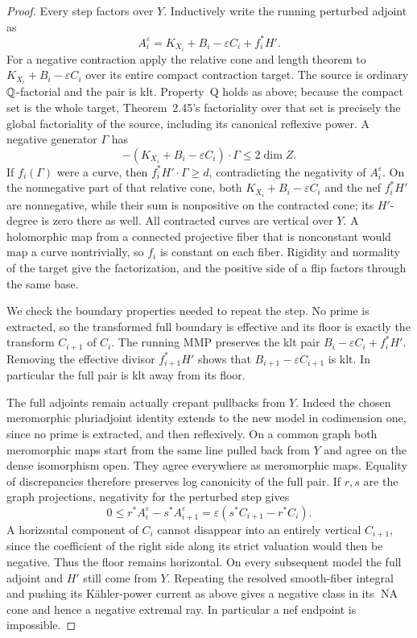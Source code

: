 \begin{proof}
Every step factors over \(Y\).  Inductively write the running perturbed
adjoint as
\[
 A_i^{\varepsilon}=K_{X_i}+B_i-\varepsilon C_i+f_i^*H'.
\]
For a negative contraction apply the relative cone and length theorem
\cite[Theorem~2.45]{DasHaconPaun2024} to \(K_{X_i}+B_i-\varepsilon C_i\)
over its entire compact contraction target.  The source is ordinary
\(\mathbb Q\)-factorial and the pair is klt.  Property~Q holds as above; because
the compact set is the whole target, Theorem~2.45's factoriality over
that set is precisely the global factoriality of the source, including
its canonical reflexive power.  A negative generator \(\Gamma\) has
\[
 -(K_{X_i}+B_i-\varepsilon C_i)\cdot\Gamma\leq2\dim Z.
\]
If \(f_i(\Gamma)\) were a curve, then \(f_i^*H'\cdot\Gamma\geq d\),
contradicting the negativity of \(A_i^{\varepsilon}\).  On the nonnegative
part of that relative cone, both \(K_{X_i}+B_i-\varepsilon C_i\) and the nef
\(f_i^*H'\) are nonnegative, while their sum is nonpositive on the
contracted cone; its \(H'\)-degree is zero there as well.  All contracted
curves are vertical over \(Y\).  A holomorphic map from a connected
projective fiber that is nonconstant would map a curve nontrivially, so
\(f_i\) is constant on each fiber.  Rigidity and normality of the target
give the factorization, and the positive side of a flip factors through
the same base.

We check the boundary properties needed to repeat the step.  No prime is
extracted, so the transformed full boundary is effective and its floor
is exactly the transform \(C_{i+1}\) of \(C_i\).  The running MMP
preserves the klt pair
\(B_i-\varepsilon C_i+f_i^*H'\).  Removing the effective divisor
\(f_{i+1}^*H'\) shows that \(B_{i+1}-\varepsilon C_{i+1}\) is klt.
In particular the full pair is klt away from its floor.

The full adjoints remain actually crepant pullbacks from \(Y\).
Indeed the chosen meromorphic pluriadjoint identity extends to the new
model in codimension one, since no prime is extracted, and then
reflexively.  On a common graph both meromorphic maps start from the same
line pulled back from \(Y\) and agree on the dense isomorphism open.
They agree everywhere as meromorphic maps.  Equality of discrepancies
therefore preserves log canonicity of the full pair.  If \(r,s\) are
the graph projections, negativity for the perturbed step gives
\begin{equation}\label{eq:horizontal-persistence}
 0\leq r^*A_i^{\varepsilon}-s^*A_{i+1}^{\varepsilon}
   =\varepsilon(s^*C_{i+1}-r^*C_i).
\end{equation}
A horizontal component of \(C_i\) cannot disappear into an entirely
vertical \(C_{i+1}\), since the coefficient of the right side along its
strict valuation would then be negative.  Thus the floor remains horizontal.
On every subsequent model the full adjoint and \(H'\) still come from
\(Y\).  Repeating the resolved smooth-fiber integral and pushing its
K\"ahler-power current as above gives a negative class in its
\(\overline{\operatorname{NA}}\) cone and hence a negative extremal ray.
In particular a nef endpoint is impossible.


\end{proof}

